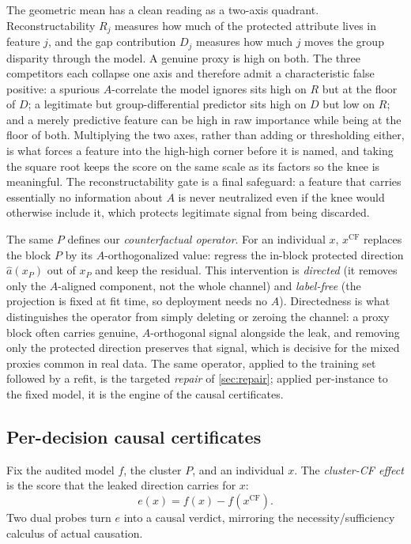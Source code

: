 \documentclass[sn-mathphys-num]{sn-jnl}
\newcommand{\xcf}{x^{\mathrm{CF}}}
\begin{document}
The geometric mean has a clean reading as a two-axis quadrant. Reconstructability
$R_j$ measures how much of the protected attribute lives in feature $j$, and the
gap contribution $D_j$ measures how much $j$ moves the group disparity through the
model. A genuine proxy is high on both. The three competitors each collapse one
axis and therefore admit a characteristic false positive: a spurious
$A$-correlate the model ignores sits high on $R$ but at the floor of $D$; a
legitimate but group-differential predictor sits high on $D$ but low on $R$; and a
merely predictive feature can be high in raw importance while being at the floor of
both. Multiplying the two axes, rather than adding or thresholding either, is what
forces a feature into the high-high corner before it is named, and taking the
square root keeps the score on the same scale as its factors so the knee is
meaningful. The reconstructability gate is a final safeguard: a feature that
carries essentially no information about $A$ is never neutralized even if the knee
would otherwise include it, which protects legitimate signal from being discarded.

The same $P$ defines our \emph{counterfactual operator}. For an individual $x$,
$\xcf$ replaces the block $P$ by its $A$-orthogonalized value: regress the
in-block protected direction $\hat a(x_P)$ out of $x_P$ and keep the residual.
This intervention is \emph{directed} (it removes only the $A$-aligned component,
not the whole channel) and \emph{label-free} (the projection is fixed at fit
time, so deployment needs no $A$). Directedness is what distinguishes the operator
from simply deleting or zeroing the channel: a proxy block often carries genuine,
$A$-orthogonal signal alongside the leak, and removing only the protected
direction preserves that signal, which is decisive for the mixed proxies common in
real data. The same operator, applied to the training set followed by a refit, is
the targeted \emph{repair} of \cref{sec:repair}; applied per-instance to the fixed
model, it is the engine of the causal certificates.

\subsection{Per-decision causal certificates}
\label{sec:cert}
Fix the audited model $f$, the cluster $P$, and an individual $x$. The
\emph{cluster-CF effect} is the score that the leaked direction carries for $x$:
\begin{equation}
  e(x)=f(x)-f(\xcf).
  \label{eq:effect}
\end{equation}
Two dual probes turn $e$ into a causal verdict, mirroring the
necessity/sufficiency calculus of actual causation.
\end{document}
